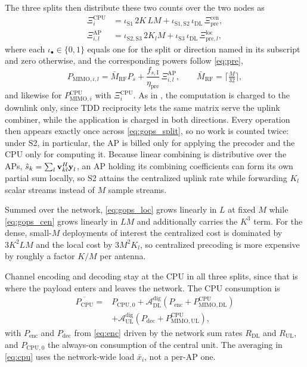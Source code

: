 The three splits then distribute these two counts over the two nodes as
\begin{align}
\label{eq:gops_split}
\Xi^{\mathrm{CPU}}_{i} &= \iota_{\mathrm{S1}}\,2K\,LM
+ \iota_{\mathrm{S1,S2}}\,\iota_{\mathrm{DL}}\,\Xi_{\mathrm{pre}}^{\mathrm{cen}},\\
\Xi_{i,l}^{\mathrm{AP}} &= \iota_{\mathrm{S2,S3}}\,2K_{l}M
+ \iota_{\mathrm{S3}}\,\iota_{\mathrm{DL}}\,\Xi_{\mathrm{pre},l}^{\mathrm{loc}},
\end{align}
where each $\iota_{\bullet}\in\{0,1\}$ equals one for the split or direction
named in its subscript and zero otherwise, and the corresponding powers follow
\eqref{eq:pre},
\begin{equation}
\label{eq:pmimo}
P_{\mathrm{MIMO},i,l} = \bar M_{\mathrm{RF}}P_{s}
+ \frac{f_{s,\mathrm{I}}}{\eta_{\mathrm{pre}}}\,\Xi_{i,l}^{\mathrm{AP}},
\qquad
\bar M_{\mathrm{RF}} = \Big\lceil \tfrac{M}{32} \Big\rceil ,
\end{equation}
and likewise for $P_{\mathrm{MIMO},i}^{\mathrm{CPU}}$ with
$\Xi^{\mathrm{CPU}}_{i}$. As in , the computation is charged to the
downlink only, since TDD reciprocity lets the same matrix serve the uplink
combiner, while the application is charged in both directions. Every operation
then appears exactly once across \eqref{eq:gops_split}, so no work is counted
twice: under S2, in particular, the AP is billed only for applying the precoder
and the CPU only for computing it. Because linear combining is distributive over
the APs, $\hat s_{k}=\sum_{l}\boldsymbol{\mathrm{v}}_{kl}^{H}\boldsymbol{\mathrm{y}}_{l}$, an AP holding its
combining coefficients can form its own partial sum locally, so S2 attains the
centralized uplink rate while forwarding $K_{l}$ scalar streams instead of $M$
sample streams.

Summed over the network, \eqref{eq:gops_loc} grows linearly in $L$ at fixed $M$
while \eqref{eq:gops_cen} grows linearly in $LM$ and additionally carries the
$K^{3}$ term. For the dense, small-$M$ deployments of interest the centralized
cost is dominated by $3K^{2}LM$ and the local cost by $3M^{2}K_{l}$, so
centralized precoding is more expensive by roughly a factor $K/M$ per antenna.

Channel encoding and decoding stay at the CPU in all three splits, since that is
where the payload enters and leaves the network. The CPU consumption is
\begin{align}
\label{eq:cpu}
\overline{P_{\mathrm{CPU}}} ={}& P_{\mathrm{CPU},0}
+ \mathcal{A}_{\mathrm{DL}}^{\mathrm{dig}}\!\left(P_{\mathrm{enc}}
+ P_{\mathrm{MIMO,DL}}^{\mathrm{CPU}}\right) \nonumber\\
&+ \mathcal{A}_{\mathrm{UL}}^{\mathrm{dig}}\!\left(P_{\mathrm{dec}}
+ P_{\mathrm{MIMO,UL}}^{\mathrm{CPU}}\right),
\end{align}
with $P_{\mathrm{enc}}$ and $P_{\mathrm{dec}}$ from \eqref{eq:enc} driven by the
network sum rates $R_{\mathrm{DL}}$ and $R_{\mathrm{UL}}$, and
$P_{\mathrm{CPU},0}$ the always-on consumption of the central unit. The averaging
in \eqref{eq:cpu} uses the network-wide load $\bar x_{i}$, not a per-AP one.

